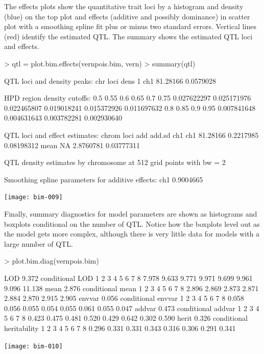 \documentclass{article}
\begin{document}
The effects plots show the quantitative trait loci by a histogram and
density (blue) on the top plot and effects (additive and possibly
dominance) in scatter plot with a smoothing spline fit plus or minus
two standard errors. Vertical lines (red) identify the estimated QTL.
The summary shows the estimated QTL loci and effects.

\begin{Schunk}
\begin{Sinput}
> qtl = plot.bim.effects(vernpois.bim, vern)
> summary(qtl)
\end{Sinput}
\begin{Soutput}
QTL loci and density peaks:
  chr     loci      dens
1 ch1 81.28166 0.0579028

HPD region density cutoffs:
        0.5        0.55         0.6        0.65         0.7        0.75 
0.027622297 0.025171976 0.022465807 0.019018241 0.015372926 0.011697632 
        0.8        0.85         0.9        0.95 
0.007841648 0.004631643 0.003782281 0.002930640 

QTL loci and effect estimates:
    chrom     loci       add     add.sd
ch1   ch1 81.28166 0.2217985 0.08198312
     mean       NA 2.8760781 0.03777311

QTL density estimates by chromosome at 512 grid points with bw = 2 

Smoothing spline parameters for additive effects:
      ch1 
0.9004665 
\end{Soutput}
\end{Schunk}
\texttt{[image: bim-009]}

Finally, summary diagnostics for model parameters are shown as
histograms and boxplots conditional on the number of QTL. Notice how
the boxplots level out as the model gets more complex, although there
is very little data for models with a large number of QTL.

\begin{Schunk}
\begin{Sinput}
> plot.bim.diag(vernpois.bim)
\end{Sinput}
\begin{Soutput}
LOD 9.372 
conditional LOD 
     1      2      3      4      5      6      7      8 
 7.978  9.633  9.771  9.971  9.699  9.961  9.096 11.138 
mean 2.876 
conditional mean 
    1     2     3     4     5     6     7     8 
2.896 2.869 2.873 2.871 2.884 2.870 2.915 2.905 
envvar 0.056 
conditional envvar 
    1     2     3     4     5     6     7     8 
0.058 0.056 0.055 0.054 0.055 0.061 0.055 0.047 
addvar 0.473 
conditional addvar 
    1     2     3     4     5     6     7     8 
0.423 0.475 0.481 0.520 0.429 0.642 0.302 0.590 
herit 0.326 
conditional heritability 
    1     2     3     4     5     6     7     8 
0.296 0.331 0.331 0.343 0.316 0.306 0.291 0.341 
\end{Soutput}
\end{Schunk}
\texttt{[image: bim-010]}
\end{document}
